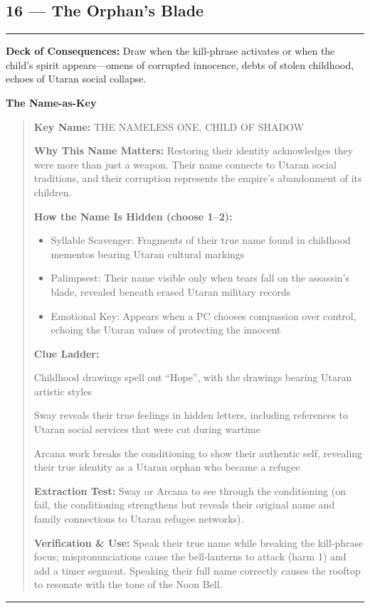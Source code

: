\documentclass[18pt, letterpaper, twoside]{article}
\newenvironment{floorbox}[1]{%
    \begin{center}
    \begin{minipage}{0.95\textwidth}
    \subsection*{#1}
    \vspace{-0.5em}
    \rule{\textwidth}{0.5pt}
    \vspace{0.5em}
}{%
    \vspace{0.5em}
    \rule{\textwidth}{0.5pt}
    \end{minipage}
    \end{center}
}
\newenvironment{gmnote}[1]{%
    \vspace{0.5em}
    \noindent\textbf{#1}
    \begin{quote}
}{%
    \end{quote}
    \vspace{0.5em}
}
\newcommand{\deckdraw}[1]{\noindent\textbf{Deck of Consequences:} #1\par}
\newcommand{\keyname}[1]{\noindent\textbf{Key Name:} #1\par}
\newcommand{\nameimportance}[1]{\noindent\textbf{Why This Name Matters:} #1\par}
\begin{document}
\begin{floorbox}{16 --- The Orphan's Blade}
\deckdraw{Draw when the kill-phrase activates or when the child's spirit appears---omens of corrupted innocence, debts of stolen childhood, echoes of Utaran social collapse.}

\begin{gmnote}{The Name-as-Key}
\keyname{THE NAMELESS ONE, CHILD OF SHADOW}
\nameimportance{Restoring their identity acknowledges they were more than just a weapon. Their name connects to Utaran social traditions, and their corruption represents the empire's abandonment of its children.}

\textbf{How the Name Is Hidden (choose 1--2):}
\begin{itemize}[leftmargin=*]
    \item Syllable Scavenger: Fragments of their true name found in childhood mementos bearing Utaran cultural markings
    \item Palimpsest: Their name visible only when tears fall on the assassin's blade, revealed beneath erased Utaran military records
    \item Emotional Key: Appears when a PC chooses compassion over control, echoing the Utaran values of protecting the innocent
\end{itemize}

\textbf{Clue Ladder:}
\begin{description}[leftmargin=*, style=unboxed]
    \item[Gentle Nudge:] Childhood drawings spell out ``Hope'', with the drawings bearing Utaran artistic styles
    \item[Actionable Lead:] Sway reveals their true feelings in hidden letters, including references to Utaran social services that were cut during wartime
    \item[Aha! Proof:] Arcana work breaks the conditioning to show their authentic self, revealing their true identity as a Utaran orphan who became a refugee
\end{description}

\textbf{Extraction Test:} Sway or Arcana to see through the conditioning (on fail, the conditioning strengthens but reveals their original name and family connections to Utaran refugee networks).

\textbf{Verification \& Use:} Speak their true name while breaking the kill-phrase focus; mispronunciations cause the bell-lanterns to attack (harm 1) and add a timer segment. Speaking their full name correctly causes the rooftop to resonate with the tone of the Noon Bell.
\end{gmnote}


\end{floorbox}
\end{document}
